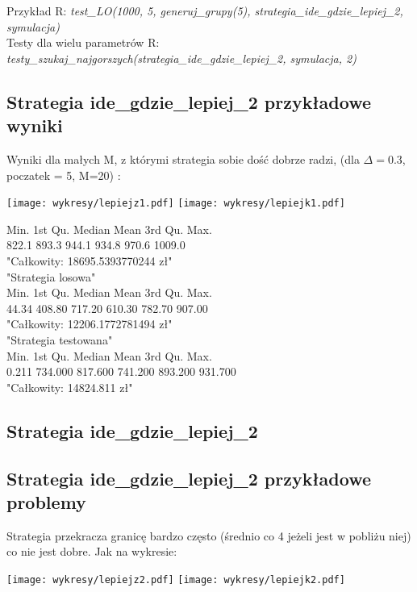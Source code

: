 \documentclass{article}
\begin{document}
Przykład R: \textit{test\_LO(1000, 5, generuj\_grupy(5), strategia\_ide\_gdzie\_lepiej\_2, symulacja)}\\
Testy dla wielu parametrów R: \textit{testy\_szukaj\_najgorszych(strategia\_ide\_gdzie\_lepiej\_2, symulacja, 2)}\\

\subsection{Strategia ide\_gdzie\_lepiej\_2 przykładowe wyniki}
Wyniki dla małych M, z którymi strategia sobie dość dobrze radzi, (dla $\Delta = 0.3$, poczatek = 5, M=20) :
\begin{center}
\texttt{[image: wykresy/lepiejz1.pdf]}
\texttt{[image: wykresy/lepiejk1.pdf]}
\end{center}

   Min. 1st Qu.  Median    Mean 3rd Qu.    Max. \\
  822.1   893.3   944.1   934.8   970.6  1009.0 \\
"Całkowity:  18695.5393770244 zł"\\
"Strategia losowa"\\
   Min. 1st Qu.  Median    Mean 3rd Qu.    Max. \\
  44.34  408.80  717.20  610.30  782.70  907.00 \\
"Całkowity:  12206.1772781494 zł"\\
"Strategia testowana"\\
   Min. 1st Qu.  Median    Mean 3rd Qu.    Max. \\
  0.211 734.000 817.600 741.200 893.200 931.700 \\
"Całkowity:  14824.811 zł"\\

\subsection{Strategia ide\_gdzie\_lepiej\_2 }

    
\subsection{Strategia ide\_gdzie\_lepiej\_2 przykładowe problemy}
Strategia przekracza granicę bardzo często (średnio co 4 jeżeli jest w pobliżu niej) co nie jest dobre. Jak na wykresie:
\begin{center}
\texttt{[image: wykresy/lepiejz2.pdf]}
\texttt{[image: wykresy/lepiejk2.pdf]}
\end{center}
\end{document}
